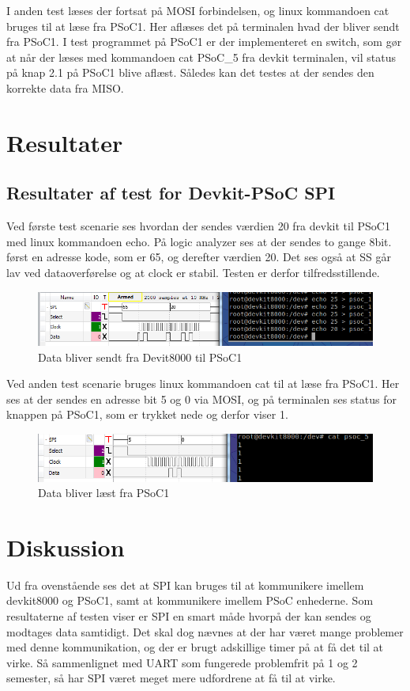 I anden test læses der fortsat på MOSI forbindelsen, og linux kommandoen cat bruges til at læse fra PSoC1. Her aflæses det på terminalen hvad der bliver sendt 
fra PSoC1. I test programmet på PSoC1 er der implementeret en switch, som gør at når der læses med kommandoen cat PSoC{\_}5 fra devkit terminalen, vil 
status på knap 2.1 på PSoC1 blive aflæst. Således kan det testes at der sendes den korrekte data fra MISO.     


\section{Resultater}
\subsection{Resultater af test for Devkit-PSoC SPI}
Ved første test scenarie ses hvordan der sendes værdien 20 fra devkit til PSoC1 med linux kommandoen echo. På logic analyzer ses at der sendes to gange 8bit.
først en adresse kode, som er 65, og derefter værdien 20. Det ses også at SS går lav ved dataoverførelse og at clock er stabil. Testen er derfor tilfredsstillende.
 
\begin{figure}[H]
\includegraphics{Screenshots/Analog_devkit_echo_psoc_1}
\caption{Data bliver sendt fra Devit8000 til PSoC1} 
\end{figure}

Ved anden test scenarie bruges linux kommandoen cat til at læse fra PSoC1. Her ses at der sendes en adresse bit 5 og 0 via MOSI, og på terminalen ses
status for knappen på PSoC1, som er trykket nede og derfor viser 1. 

\begin{figure}[H]
\includegraphics{Screenshots/Analog_cat_psoc_5}
\caption{Data bliver læst fra PSoC1} 
\end{figure}

\section{Diskussion}
Ud fra ovenstående ses det at SPI kan bruges til at kommunikere imellem devkit8000 og PSoC1, samt at kommunikere imellem PSoC enhederne. Som resultaterne af 
testen viser er SPI en smart måde hvorpå der kan sendes og modtages data samtidigt. Det skal dog nævnes at der har været mange problemer med denne kommunikation,
og der er brugt adskillige timer på at få det til at virke. Så sammenlignet med UART som fungerede problemfrit på 1 og 2 semester, så har SPI været meget mere
udfordrene at få til at virke. 